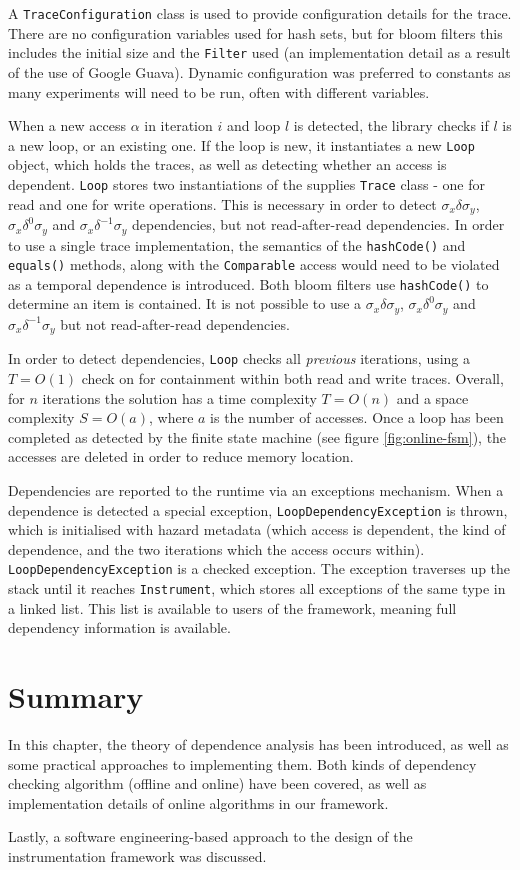 		A \texttt{TraceConfiguration} class is used to provide configuration details for the trace. There are no configuration variables used for hash sets, but for bloom filters this includes the initial size and the \texttt{Filter} used (an implementation detail as a result of the use of Google Guava). Dynamic configuration was preferred to constants as many experiments will need to be run, often with different variables.
		
		When a new access $\alpha$ in iteration $i$ and loop $l$ is detected, the library checks if $l$ is a new loop, or an existing one. If the loop is new, it instantiates a new \texttt{Loop} object, which holds the traces, as well as detecting whether an access is dependent. \texttt{Loop} stores two instantiations of the supplies \texttt{Trace} class - one for read and one for write operations. This is necessary in order to detect $\sigma_x \delta \sigma_y$, $\sigma_x \delta^0 \sigma_y$ and $\sigma_x \delta^{-1} \sigma_y$ dependencies, but not read-after-read dependencies. In order to use a single trace implementation, the semantics of the \texttt{hashCode()} and \texttt{equals()} methods, along with the \texttt{Comparable} access would need to be violated as a temporal dependence is introduced. Both bloom filters use \texttt{hashCode()} to determine an item is contained. It is not possible to use a $\sigma_x \delta \sigma_y$, $\sigma_x \delta^0 \sigma_y$ and $\sigma_x \delta^{-1} \sigma_y$ but not read-after-read dependencies.
		
		In order to detect dependencies, \texttt{Loop} checks all \emph{previous} iterations, using a $T=O(1)$ check on for containment within both read and write traces. Overall, for $n$ iterations the solution has a time complexity $T=O(n)$ and a space complexity $S=O(a)$, where $a$ is the number of accesses. Once a loop has been completed as detected by the finite state machine (see figure \ref{fig:online-fsm}), the accesses are deleted in order to reduce memory location.
		
		Dependencies are reported to the runtime via an exceptions mechanism. When a dependence is detected a special exception, \texttt{LoopDependencyException} is thrown, which is initialised with hazard metadata (which access is dependent, the kind of dependence, and the two iterations which the access occurs within). \texttt{LoopDependencyException} is a checked exception. The exception traverses up the stack until it reaches \texttt{Instrument}, which stores all exceptions of the same type in a linked list. This list is available to users of the framework, meaning full dependency information is available.

\section{Summary} \label{sec:runtime/summary}
In this chapter, the theory of dependence analysis has been introduced, as well as some practical approaches to implementing them. Both kinds of dependency checking algorithm (offline and online) have been covered, as well as implementation details of online algorithms in our framework.

Lastly, a software engineering-based approach to the design of the instrumentation framework was discussed.